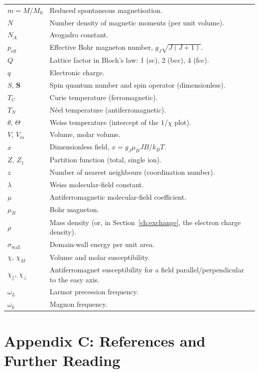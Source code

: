 \documentclass[11pt,a4paper]{article}
\newcommand{\vb}[1]{\mathbf{#1}}
\begin{document}
\begin{longtable}{p{2.4cm} p{12.6cm}}
$m = M/M_0$ & Reduced spontaneous magnetisation. \\
$N$ & Number density of magnetic moments (per unit volume). \\
$N_A$ & Avogadro constant. \\
$p_{\mathrm{eff}}$ & Effective Bohr magneton number, $g_J\sqrt{J(J+1)}$. \\
$Q$ & Lattice factor in Bloch's law: 1 (sc), 2 (bcc), 4 (fcc). \\
$q$ & Electronic charge. \\
$S$, $\vb{S}$ & Spin quantum number and spin operator (dimensionless). \\
$T_C$ & Curie temperature (ferromagnetic). \\
$T_N$ & N\'eel temperature (antiferromagnetic). \\
$\theta$, $\Theta$ & Weiss temperature (intercept of the $1/\chi$ plot). \\
$V$, $V_m$ & Volume, molar volume. \\
$x$ & Dimensionless field, $x = g_J\mu_BJB/k_BT$. \\
$Z$, $Z_1$ & Partition function (total, single ion). \\
$z$ & Number of nearest neighbours (coordination number). \\
$\lambda$ & Weiss molecular-field constant. \\
$\mu$ & Antiferromagnetic molecular-field coefficient. \\
$\mu_B$ & Bohr magneton. \\
$\rho$ & Mass density (or, in Section~\ref{ch:exchange}, the electron charge density). \\
$\sigma_{\mathrm{wall}}$ & Domain-wall energy per unit area. \\
$\chi$, $\chi_M$ & Volume and molar susceptibility. \\
$\chi_\parallel$, $\chi_\perp$ & Antiferromagnet susceptibility for a field parallel/perpendicular to the easy axis. \\
$\omega_L$ & Larmor precession frequency. \\
$\omega_k$ & Magnon frequency. \\
\bottomrule
\end{longtable}

\section{Appendix C: References and Further Reading}
\label{app:refs}
\end{document}
